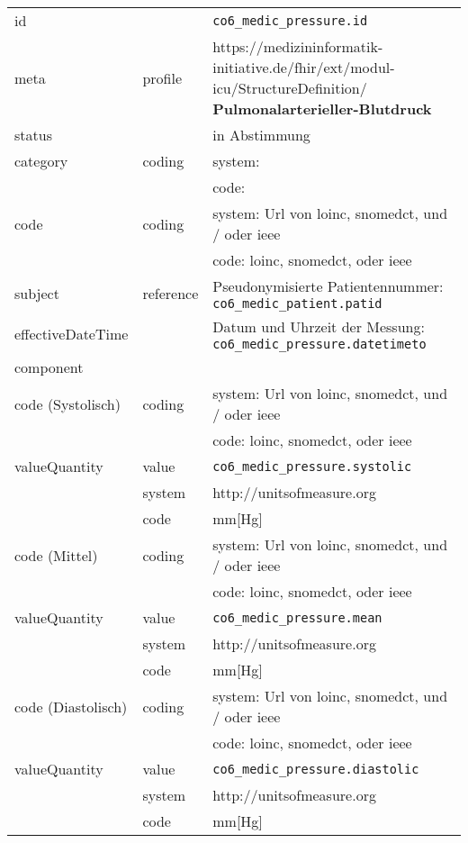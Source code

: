 \begin{longtable}{|l|l|p{7.5cm}|}
        \hline
        \rowcolor{lightgray} \multicolumn{3}{|l|}{Data Mapping (inhaltlich)} \\ \hline
        id &  & \texttt{co6\_medic\_pressure.id} \\ \hline
	meta & profile & https://medizininformatik-initiative.de/fhir/ext/modul-icu/StructureDefinition/\textbf{
Pulmonalarterieller-Blutdruck} \\ \hline 
	status &  & in Abstimmung  \\ \hline 
	category & coding & system:  \\ 
\cline{3-3}
        & & code:  \\ \hline
        code & coding & system: Url von \ac{loinc}, \ac{snomedct}, und / oder \ac{ieee} \\
        \cline{3-3}
         &  & code: \ac{loinc}, \ac{snomedct}, oder \ac{ieee} \\ \hline
        subject & reference & Pseudonymisierte Patientennummer: \texttt{co6\_medic\_patient.patid} \\ \hline
        effectiveDateTime & & Datum und Uhrzeit der Messung:  \texttt{co6\_medic\_pressure.datetimeto} \\ \hline
	\multicolumn{3}{|l|}{component} \\ \hline
	code (Systolisch)  & coding & system: Url von \ac{loinc}, \ac{snomedct}, und / oder \ac{ieee} \\ 
	\cline{3-3} 
	&  & code: \ac{loinc}, \ac{snomedct}, oder \ac{ieee} \\ \hline	
	valueQuantity & value & \texttt{co6\_medic\_pressure.systolic} \\
	\cline{2-3}
	& system & http://unitsofmeasure.org \\ 
	\cline{2-3}
	& code & mm[Hg] \\ \hline
	code (Mittel)  & coding & system: Url von \ac{loinc}, \ac{snomedct}, und / oder \ac{ieee} \\ 
	\cline{3-3} 
	&  & code: \ac{loinc}, \ac{snomedct}, oder \ac{ieee} \\ \hline	
	valueQuantity & value & \texttt{co6\_medic\_pressure.mean} \\
	\cline{2-3}
	& system & http://unitsofmeasure.org \\ 
	\cline{2-3}
	& code &  mm[Hg] \\ \hline
	code (Diastolisch)  & coding & system: Url von \ac{loinc}, \ac{snomedct}, und / oder \ac{ieee} \\ 
	\cline{3-3} 
	&  & code: \ac{loinc}, \ac{snomedct}, oder \ac{ieee} \\ \hline	
	valueQuantity & value & \texttt{co6\_medic\_pressure.diastolic} \\
	\cline{2-3}
	& system & http://unitsofmeasure.org \\ 
	\cline{2-3}
	& code & mm[Hg] \\ \hline
\end{longtable}

